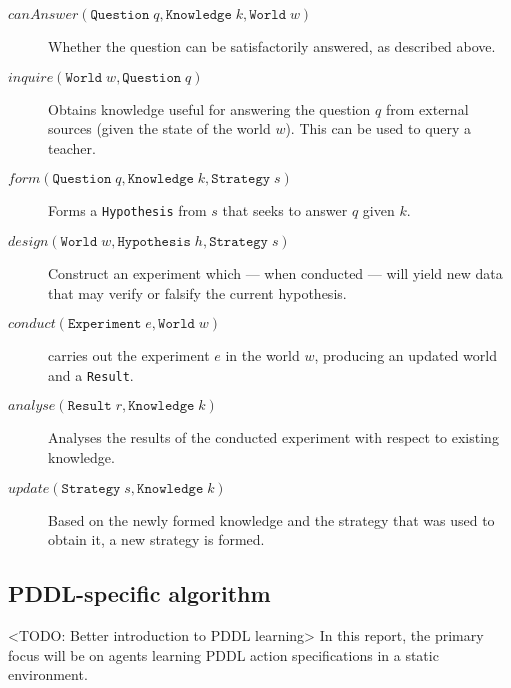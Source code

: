 \documentclass[master.tex]{subfiles}
\begin{document}
\begin{description}
    \item[$canAnswer( \texttt{Question} \; q
                    , \texttt{Knowledge} \; k
                    , \texttt{World} \; w
                    )
         $]
        Whether the question can be satisfactorily answered, as described above.

    \item[$inquire( \texttt{World} \; w
                  , \texttt{Question} \; q
                  )
         $]
        Obtains knowledge useful for answering the question $q$ from external sources (given the state of the world $w$). This can be used to query a teacher.

    \item[$form( \texttt{Question} \; q
               , \texttt{Knowledge} \; k
               , \texttt{Strategy} \; s
               )
         $]
        Forms a \texttt{Hypothesis} from $s$ that seeks to answer $q$ given $k$.

    \item[$design( \texttt{World} \; w
                 , \texttt{Hypothesis} \; h
                 , \texttt{Strategy} \; s
                 )
         $]
        Construct an experiment which --- when conducted --- will yield new data that may verify or falsify the current hypothesis.

    \item[$conduct( \texttt{Experiment} \; e
                  , \texttt{World} \; w
                  )
         $]
        carries out the experiment $e$ in the world $w$, producing an updated world and a \texttt{Result}.

    \item[$analyse( \texttt{Result} \; r
                  , \texttt{Knowledge} \; k
                  )
         $]
        Analyses the results of the conducted experiment with respect to existing knowledge.

    \item[$update( \texttt{Strategy} \; s
                 , \texttt{Knowledge} \; k
                 )
         $]
        Based on the newly formed knowledge and the strategy that was used to obtain it, a new strategy is formed.
\end{description}

\subsection{PDDL-specific algorithm}
<TODO: Better introduction to PDDL learning>
In this report, the primary focus will be on agents learning PDDL action specifications in a static environment.
\end{document}
